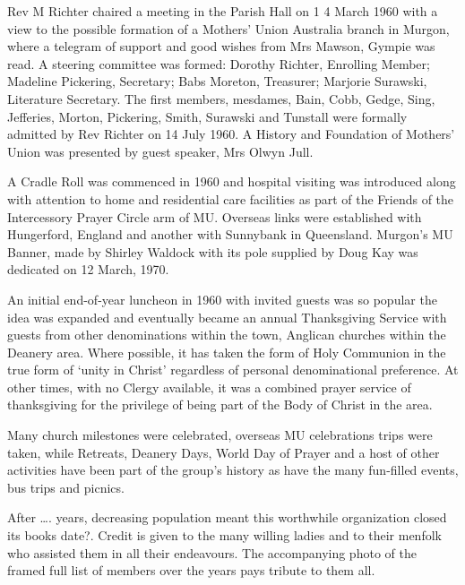 Rev M Richter chaired a meeting in the Parish Hall on 1 4 March 1960 with a view to the possible formation of a Mothers' Union Australia branch in Murgon, where a telegram of support and good wishes from Mrs Mawson, Gympie was read. A steering committee was formed: Dorothy Richter, Enrolling Member; Madeline Pickering, Secretary; Babs Moreton, Treasurer; Marjorie Surawski, Literature Secretary. The first members, mesdames, Bain, Cobb, Gedge, Sing, Jefferies, Morton, Pickering, Smith, Surawski and Tunstall were formally admitted by Rev Richter on 14 July 1960. A History and Foundation of Mothers' Union was presented by guest speaker, Mrs Olwyn Jull.



A Cradle Roll was commenced in 1960 and hospital visiting was introduced along with attention to home and residential care facilities as part of the Friends of the Intercessory Prayer Circle arm of MU. Overseas links were established with Hungerford, England and another with Sunnybank in Queensland. Murgon's MU Banner, made by Shirley Waldock with its pole supplied by Doug Kay was dedicated on 12 March, 1970.



An initial end-of-year luncheon in 1960 with invited guests was so popular the idea was expanded and eventually became an annual Thanksgiving Service with guests from other denominations within the town, Anglican churches within the Deanery area. Where possible, it has taken the form of Holy Communion in the true form of `unity in Christ' regardless of personal denominational preference. At other times, with no Clergy available, it was a combined prayer service of thanksgiving for the privilege of being part of the Body of Christ in the area.



Many church milestones were celebrated, overseas MU celebrations trips were taken, while Retreats, Deanery Days, World Day of Prayer and a host of other activities have been part of the group's history as have the many fun-filled events, bus trips and picnics.



After \ldots. years, decreasing population meant this worthwhile organization closed its books date?. Credit is given to the many willing ladies and to their menfolk who assisted them in all their endeavours. The accompanying photo of the framed full list of members over the years pays tribute to them all.



